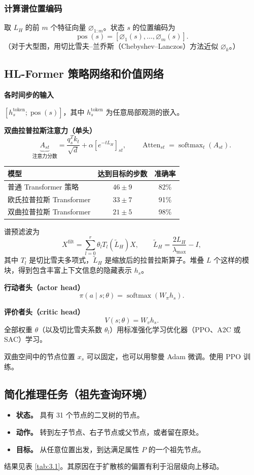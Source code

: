 \subsubsection{计算谱位置编码}
取 $L_H$ 的前 $m$ 个特征向量 $\varnothing_{1:m}$。状态 $s$ 的位置编码为
\[
  \operatorname{pos}(s)=[\varnothing_1(s),\dots,\varnothing_m(s)].
\]
（对于大型图，用切比雪夫–兰乔斯（Chebyshev–Lanczos）方法近似 $\varnothing_k$。）

\subsection{HL-Former 策略网络和价值网络}
\noindent\textbf{各时间步的输入}\par
$[h_s^{\mathrm{token}};\operatorname{pos}(s)]$，其中 $h_s^{\mathrm{token}}$ 为任意局部观测的嵌入。

\noindent\textbf{双曲拉普拉斯注意力（单头）}
\[
  \underbrace{A_{st}}_{\text{注意力分数}}
    =\frac{q_s^Tk_t}{\sqrt d}+\alpha[e^{-tL_H}]_{st},\qquad
  \operatorname{Atten}_{st}=\operatorname{softmax}_t(A_{st}).
\]

\begin{table}[tbp]
\centering
{}
\begin{tabular}{lcc}
\toprule
模型 & 达到目标的步数 & 准确率\\
\midrule
普通 Transformer 策略 & $46\pm9$ & 82\%\\
欧氏拉普拉斯 Transformer & $33\pm7$ & 91\%\\
双曲拉普拉斯 Transformer & $21\pm5$ & 98\%\\
\bottomrule
\end{tabular}
\end{table}

谱预滤波为
\[
  X^{\mathrm{filt}}=\sum_{l=0}^{r}\theta_lT_l(\widetilde L_H)X,\qquad
  \widetilde L_H=\frac{2L_H}{\lambda_{\max}}-I,
\]
其中 $T_l$ 是切比雪夫多项式，$\widetilde L_H$ 是缩放后的拉普拉斯算子。堆叠 $L$ 个这样的模块，得到包含丰富上下文信息的隐藏表示 $h_s$。

\noindent\textbf{行动者头（actor head）}
\[
  \pi(a\mid s;\theta)=\operatorname{softmax}(W_\pi h_s).
\]

\noindent\textbf{评价者头（critic head）}
\[
  V(s;\theta)=W_vh_s.
\]
全部权重 $\theta$（以及切比雪夫系数 $\theta_l$）用标准强化学习优化器（PPO、A2C 或 SAC）学习。

双曲空间中的节点位置 $x_s$ 可以固定，也可以用黎曼 Adam 微调。使用 PPO 训练。

\subsection{简化推理任务（祖先查询环境）}
\begin{itemize}
\item \textbf{状态。} 具有 31 个节点的二叉树的节点。
\item \textbf{动作。} 转到左子节点、右子节点或父节点，或者留在原处。
\item \textbf{目标。} 从任意位置出发，到达满足属性 $P$ 的一个祖先节点。
\end{itemize}
结果见表 \ref{tab:3.1}。其原因在于扩散核的偏置有利于沿层级向上移动。

